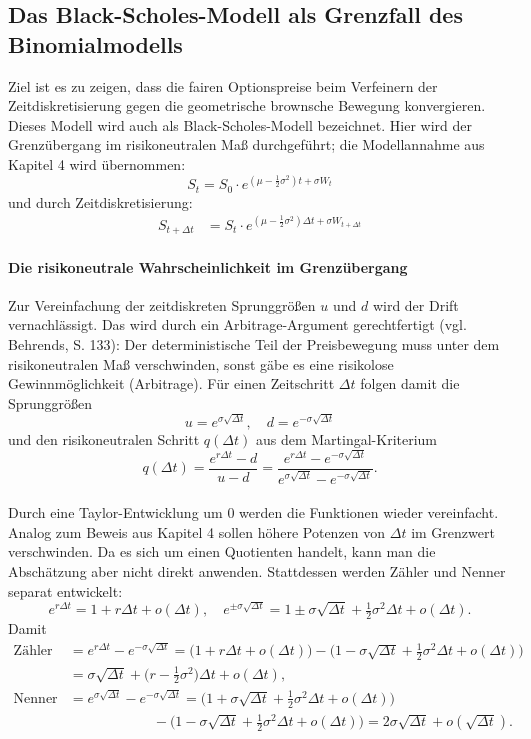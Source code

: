 \subsection{Das Black-Scholes-Modell als Grenzfall des Binomialmodells}
Ziel ist es zu zeigen, dass die fairen Optionspreise
beim Verfeinern der Zeitdiskretisierung gegen die geometrische brownsche Bewegung konvergieren.
Dieses Modell wird auch als Black-Scholes-Modell bezeichnet. Hier wird der Grenzübergang im risikoneutralen Maß durchgeführt;
die Modellannahme aus Kapitel 4 wird übernommen:
$$
S_t = S_0 \cdot e^{(\mu - \frac{1}{2}\sigma^2)t + \sigma W_t}
$$
und durch Zeitdiskretisierung:
$$
\begin{aligned}
S_{t+\Delta t} &= S_t \cdot e^{(\mu - \frac{1}{2}\sigma^2)\Delta t + \sigma W_{t+\Delta t}}
\end{aligned}
$$
\paragraph{Die risikoneutrale Wahrscheinlichkeit im Grenzübergang}
Zur Vereinfachung der zeitdiskreten Sprunggrößen $u$ und $d$ wird der Drift vernachlässigt.
Das wird durch ein Arbitrage-Argument gerechtfertigt (vgl. Behrends\cite{behrends}, S. 133):
Der deterministische Teil der Preisbewegung muss unter dem risikoneutralen Maß verschwinden, 
sonst gäbe es eine risikolose Gewinnmöglichkeit (Arbitrage). 
Für einen Zeitschritt $\Delta t$ folgen damit die Sprunggrößen
$$
u = e^{\sigma \sqrt{\Delta t}},\quad d = e^{-\sigma \sqrt{\Delta t}}
$$
und den risikoneutralen Schritt $q(\Delta t)$ aus dem Martingal-Kriterium
$$
q(\Delta t) = \frac{e^{r \Delta t} - d}{u - d}
= \frac{e^{r \Delta t} - e^{-\sigma \sqrt{\Delta t}}}{e^{\sigma \sqrt{\Delta t}} - e^{-\sigma \sqrt{\Delta t}}}.
$$
\\ Durch eine Taylor-Entwicklung um $0$ werden die Funktionen wieder vereinfacht. Analog zum Beweis aus Kapitel 4
sollen höhere Potenzen von $\Delta t$ im Grenzwert verschwinden. Da es sich um einen Quotienten handelt,
kann man die Abschätzung aber nicht direkt anwenden. Stattdessen werden Zähler und Nenner separat entwickelt:
$$
e^{r\Delta t} = 1 + r\Delta t + o(\Delta t),\quad
e^{\pm \sigma\sqrt{\Delta t}} = 1 \pm \sigma \sqrt{\Delta t} + \tfrac12 \sigma^2 \Delta t + o(\Delta t).
$$
Damit
$$
\begin{aligned}
\text{Zähler} &= e^{r \Delta t} - e^{-\sigma \sqrt{\Delta t}}
= \big(1 + r\Delta t + o(\Delta t)\big) - \big(1 - \sigma \sqrt{\Delta t} + \tfrac12 \sigma^2 \Delta t + o(\Delta t)\big) \\
&= \sigma \sqrt{\Delta t} + \big(r - \tfrac12 \sigma^2\big)\Delta t + o(\Delta t), \\
\text{Nenner} &= e^{\sigma \sqrt{\Delta t}} - e^{-\sigma \sqrt{\Delta t}}
= \big(1 + \sigma \sqrt{\Delta t} + \tfrac12 \sigma^2 \Delta t + o(\Delta t)\big) \\
&\qquad\qquad\qquad - \big(1 - \sigma \sqrt{\Delta t} + \tfrac12 \sigma^2 \Delta t + o(\Delta t)\big)
= 2\sigma \sqrt{\Delta t} + o(\sqrt{\Delta t}).
\end{aligned}
$$
